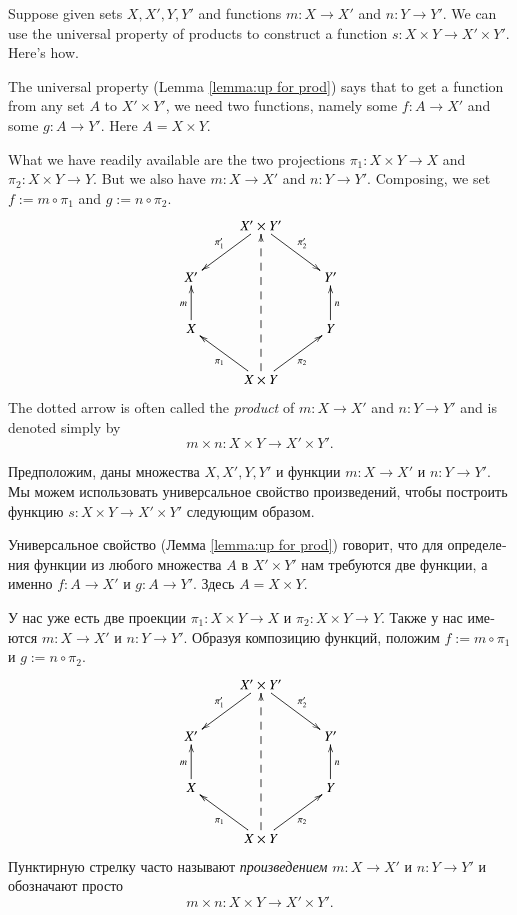 \documentclass[a4paper]{book}
\def\to{\rightarrow}
\def\taking{\colon}
\theoremstyle{myth}
\newtheorem{exampleENG}[envENG]{\begin{english}Example\end{english}}
\newtheorem{exampleRUS}[envRUS]{\begin{russian}Пример\end{russian}}
\begin{document}
\begin{english}
\begin{exampleENG}\label{ex:product to product}
Suppose given sets $X,X', Y, Y'$ and functions $m\taking X\to X'$ and $n\taking Y\to Y'$. We can use the universal property of products to construct a function $s\taking X\times Y\to X'\times Y'$.  Here's how.

The universal property (Lemma \ref{lemma:up for prod}) says that to get a function from any set $A$ to $X'\times Y'$, we need two functions, namely some $f\taking A\to X'$ and some $g\taking A\to Y'$. Here $A=X\times Y$. 

What we have readily available are the two projections $\pi_1\taking X\times Y\to X$ and $\pi_2\taking X\times Y\to Y$. But we also have $m\taking X\to X'$ and $n\taking Y\to Y'$. Composing, we set $f:=m\circ \pi_1$ and $g:=n\circ\pi_2$.
$$\xymatrix{
&X'\times Y'\ar[dl]_{\pi_1'}\ar[dr]^{\pi_2'}\\
X'&&Y'\\
X\ar[u]^m&&Y\ar[u]_n\\
&X\times Y\ar[ul]^{\pi_1}\ar[ur]_{\pi_2}\ar@{-->}[uuu]
}
$$
The dotted arrow is often called the {\em product} of $m\taking X\to X'$ and $n\taking Y\to Y'$ and is denoted simply by 
$$m\times n\taking X\times Y\to X'\times Y'.$$
\end{exampleENG}

\begin{exampleRUS}\label{ex:product to product}
\begin{russian}Предположим, даны множества $X, X', Y, Y'$ и функции $m\taking X\to X'$ и $n\taking Y\to Y'$. Мы можем использовать универсальное свойство произведений, чтобы построить функцию $s\taking X\times Y\to X'\times Y'$ следующим образом.

Универсальное свойство (Лемма \ref{lemma:up for prod}) говорит, что для определения функции из любого множества $A$ в $X'\times Y'$ нам требуются две функции, а именно $f\taking A\to X'$ и $g\taking A\to Y'$. Здесь $A=X\times Y$. 

У нас уже есть две проекции $\pi_1\taking X\times Y\to X$ и $\pi_2\taking X\times Y\to Y$. Также у нас имеются $m\taking X\to X'$ и $n\taking Y\to Y'$. Образуя композицию функций, положим $f:=m\circ \pi_1$ и $g:=n\circ\pi_2$.
$$\xymatrix{
&X'\times Y'\ar[dl]_{\pi_1'}\ar[dr]^{\pi_2'}\\
X'&&Y'\\
X\ar[u]^m&&Y\ar[u]_n\\
&X\times Y\ar[ul]^{\pi_1}\ar[ur]_{\pi_2}\ar@{-->}[uuu]
}
$$
Пунктирную стрелку часто называют {\em произведением} $m\taking X\to X'$ и $n\taking Y\to Y'$ и обозначают просто  
$$m\times n\taking X\times Y\to X'\times Y'.$$ \end{russian}
\end{exampleRUS}


\end{english}
\end{document}
